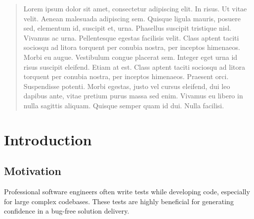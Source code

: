 \documentclass{icldt}
\numberwithin{equation}{section}       %
\begin{document}
	
	\begin{abstract}
	Lorem ipsum dolor sit amet, consectetur adipiscing elit. In risus. Ut vitae velit. Aenean malesuada adipiscing sem. Quisque ligula mauris, posuere sed, elementum id, suscipit et, urna. Phasellus suscipit tristique nisl. Vivamus ac urna. Pellentesque egestas facilisis velit. Class aptent taciti sociosqu ad litora torquent per conubia nostra, per inceptos himenaeos. Morbi eu augue. Vestibulum congue placerat sem. Integer eget urna id risus suscipit eleifend. Etiam at est. Class aptent taciti sociosqu ad litora torquent per conubia nostra, per inceptos himenaeos. Praesent orci. Suspendisse potenti. Morbi egestas, justo vel cursus eleifend, dui leo dapibus ante, vitae pretium purus massa sed enim. Vivamus eu libero in nulla sagittis aliquam. Quisque semper quam id dui. Nulla facilisi.
	
	\end{abstract}
	
	\tableofcontents
\chapter{Introduction}
\begin{comment}
\begin{itemize}
	\item What is the problem?
	\item Why is it interesting / important / difficult to solve / issues to address?
	\item What is your main idea for solving it?
\end{itemize}
\end{comment}
\section{Motivation}	%
Professional software engineers often write tests while developing code, especially for large complex codebases. These tests are highly beneficial for generating confidence in a bug-free solution delivery.
\end{document}
